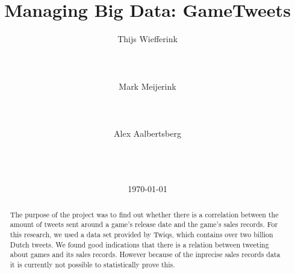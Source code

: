 \documentclass{sig-alternate-br} %
\begin{document}
\title{Managing Big Data: GameTweets}

\author{
\alignauthor Thijs Wiefferink\\
       \\
       \\
       \\
\alignauthor Mark Meijerink\\
       \\
       \\
       \\
\alignauthor Alex Aalbertsberg\\
       \\
       \\
       \\
}
\date{\today}

\maketitle

\begin{abstract}
The purpose of the project was to find out whether there is a correlation between the amount of tweets sent around a game's release date and the game's sales records. For this research, we used a data set provided by Twiqs, which contains over two billion Dutch tweets. We found good indications that there is a relation between tweeting about games and its sales records. However because of the inprecise sales records data it is currently not possible to statistically prove this.
\end{abstract}








\vspace*{5pt}
\newpage





\end{document}
